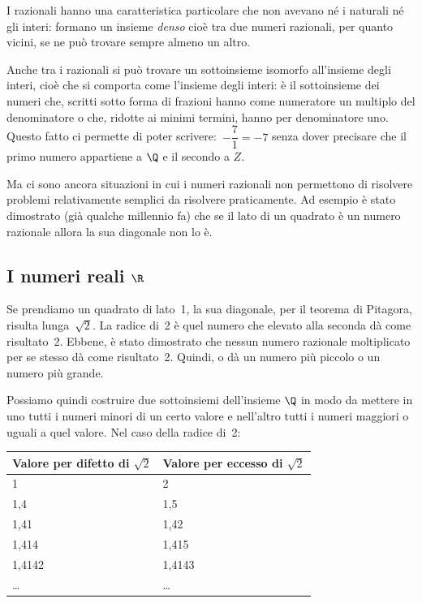 I razionali hanno una caratteristica particolare che non avevano né i 
naturali né gli interi: formano un insieme \emph{denso} cioè tra due numeri 
razionali, per quanto vicini, se ne può trovare sempre almeno un altro.

Anche tra i razionali si può trovare un sottoinsieme isomorfo all'insieme 
degli interi, cioè che si comporta come l'insieme degli interi: è il 
sottoinsieme dei numeri che, scritti sotto forma di frazioni hanno come 
numeratore un multiplo del denominatore o che, ridotte ai minimi termini, 
hanno per denominatore uno. 
Questo fatto ci permette di poter scrivere:~\(-\dfrac{7}{1} = -7\) 
senza dover precisare che il primo numero appartiene a \(\Q\) e il secondo 
a \(Z\).

Ma ci sono ancora situazioni in cui i numeri razionali non permettono di 
risolvere problemi relativamente semplici da risolvere praticamente. 
Ad esempio è stato dimostrato (già qualche millennio fa) che se il lato di 
un quadrato è un numero razionale allora la sua diagonale non lo è. 

\subsection{I numeri reali \(\R\)}
\label{subsec:insnum_reali}

Se prendiamo un quadrato di lato~1, la sua diagonale, per il teorema di 
Pitagora, risulta lunga~\(\sqrt{2}\). 
La radice di~2 è quel numero che elevato alla seconda dà come risultato~2.
Ebbene, è stato dimostrato che nessun numero razionale moltiplicato per se 
stesso dà come risultato~2. 
Quindi, o dà un numero più piccolo o un numero più grande.

Possiamo quindi costruire due sottoinsiemi dell'insieme \(\Q\) in modo da 
mettere in uno tutti i numeri minori di un certo valore e nell'altro tutti 
i 
numeri maggiori o uguali a quel valore. Nel caso della radice di~2:

\begin{center}
 \begin{tabular}{ll}
\toprule
Valore per difetto di \(\sqrt{2}\) &Valore per eccesso di \(\sqrt{2}\) \\
\midrule
1& 2\\
1,4& 1,5 \\
1,41& 1,42\\
1,414& 1,415\\
1,4142& 1,4143\\
\ldots& \ldots\\
\bottomrule
\end{tabular}
\end{center}


